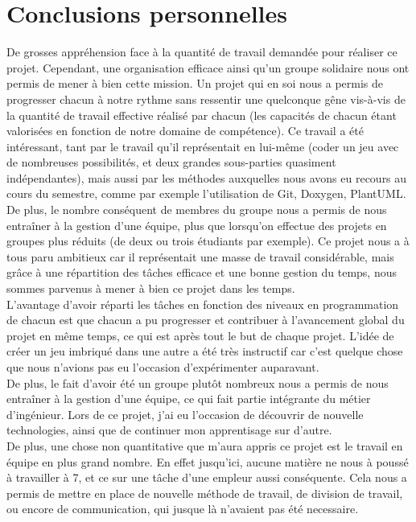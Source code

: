     \section{Conclusions personnelles}
            De grosses appréhension face à la quantité de travail demandée pour réaliser ce projet. Cependant, une organisation efficace ainsi qu'un groupe solidaire nous ont permis de mener à bien cette mission. Un projet qui en soi nous a permis de progresser chacun à notre rythme sans ressentir une quelconque gêne vis-à-vis de la quantité de travail effective réalisé par chacun (les capacités de chacun étant valorisées en fonction de notre domaine de compétence).
            Ce travail a été intéressant, tant par le travail qu'il représentait en lui-même (coder un jeu avec de nombreuses possibilités, et deux grandes sous-parties quasiment indépendantes), mais aussi par les méthodes auxquelles nous avons eu recours au cours du semestre, comme par exemple l'utilisation de Git, Doxygen, PlantUML. \\
            De plus, le nombre conséquent de membres du groupe nous a permis de nous entraîner à la gestion d'une équipe, plus que lorsqu'on effectue des projets en groupes plus réduits (de deux ou trois étudiants par exemple).
            Ce projet nous a à tous paru ambitieux car il représentait une masse de travail considérable, mais grâce à une répartition des tâches efficace et une bonne gestion du temps, nous sommes parvenus à mener à bien ce projet dans les temps. \\
            L'avantage d'avoir réparti les tâches en fonction des niveaux en programmation de chacun est que chacun a pu progresser et contribuer à l'avancement global du projet en même temps, ce qui est après tout le but de chaque projet.
            L'idée de créer un jeu imbriqué dans une autre a été très instructif car c'est quelque chose que nous n'avions pas eu l'occasion d'expérimenter auparavant. \\
            De plus, le fait d'avoir été un groupe plutôt nombreux nous a permis de nous entraîner à la gestion d'une équipe, ce qui fait partie intégrante du métier d'ingénieur.
            Lors de ce projet, j'ai eu l'occasion de découvrir de nouvelle technologies, ainsi que de continuer mon apprentisage sur d'autre. \\
            De plus, une chose non quantitative que m'aura appris ce projet est le travail en équipe en plus grand nombre. En effet jusqu'ici, aucune matière ne nous à poussé à travailler à 7, et ce sur une tâche d'une empleur aussi conséquente. Cela nous a permis de mettre en place de nouvelle méthode de travail, de division de travail, ou encore de communication, qui jusque là n'avaient pas été necessaire. \\
